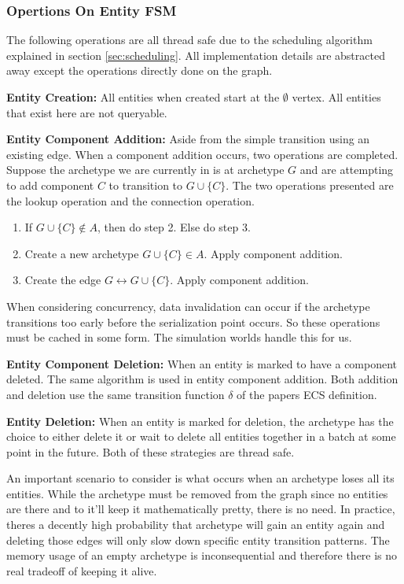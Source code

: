 \subsubsection{Opertions On Entity FSM}
The following operations are all thread safe due to the scheduling algorithm explained in section \ref{sec:scheduling}. All implementation details are abstracted away except the operations directly done on the graph. 

\textbf{Entity Creation:} All entities when created start at the $\emptyset$ vertex. All entities that exist here are not queryable.

\textbf{Entity Component Addition: } Aside from the simple transition using an existing edge. When a component addition occurs, two operations are completed. Suppose the archetype we are currently in is at archetype $G$ and are attempting to add component $C$ to transition to $G \cup \{C\}$. The two operations presented are the lookup operation and the connection operation.

\begin{enumerate}
    \item If $G \cup \{C\} \not\in A$, then do step 2. Else do step 3.
    \item Create a new archetype $G \cup \{C\} \in A$. Apply component addition.
    \item Create the edge $G \leftrightarrow G \cup \{C\}$. Apply component addition.
\end{enumerate}

When considering concurrency, data invalidation can occur if the archetype transitions too early before the serialization point occurs. So these operations must be cached in some form. The simulation worlds handle this for us.

\textbf{Entity Component Deletion: } When an entity is marked to have a component deleted. The same algorithm is used in entity component addition. Both addition and deletion use the same transition function $\delta$ of the papers ECS definition.  

\textbf{Entity Deletion: }
When an entity is marked for deletion, the archetype has the choice to either delete it or wait to delete all entities together in a batch at some point in the future. Both of these strategies are thread safe. 

An important scenario to consider is what occurs when an archetype loses all its entities. While the archetype must be removed from the graph since no entities are there and to it'll keep it mathematically pretty, there is no need. In practice, theres a decently high probability that archetype will gain an entity again and deleting those edges will only slow down specific entity transition patterns. The memory usage of an empty archetype is inconsequential and therefore there is no real tradeoff of keeping it alive.

